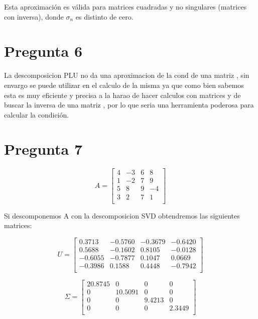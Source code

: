 \documentclass[a4paper,12pt]{article}
\begin{document}
Esta aproximación es válida para matrices cuadradas y no singulares (matrices con inversa), 
donde \( \sigma_n \) es distinto de cero. 

\section*{Pregunta 6}

La descomposicion PLU no da una aproximacion de la cond de una matriz , sin envargo se puede utilizar en el calculo de la misma ya que como bien sabemos esta es muy eficiente y precisa a la harao de hacer calculos con matrices y de buscar la inversa de una matriz , por lo que seria una herramienta poderosa para calcular la condición.

\section*{Pregunta 7}


\[
A = \begin{bmatrix}
4 & -3 & 6 & 8 \\
1 & -2 & 7 & 9 \\
5 & 8 & 9 & -4 \\
3 & 2 & 7 & 1 \\
\end{bmatrix}
\]

Si descomponemos A con la descomposicion SVD obtendremos las siguientes matrices:

\begin{equation*}
U = \begin{bmatrix}
0.3713 & -0.5760 & -0.3679 & -0.6420 \\
0.5688 & -0.1602 & 0.8105 & -0.0128 \\
-0.6055 & -0.7877 & 0.1047 & 0.0669 \\
-0.3986 & 0.1588 & 0.4448 & -0.7942 \\
\end{bmatrix}
\end{equation*}

\begin{equation*}
\Sigma = \begin{bmatrix}
20.8745 & 0 & 0 & 0 \\
0 & 10.5091 & 0 & 0 \\
0 & 0 & 9.4213 & 0 \\
0 & 0 & 0 & 2.3449 \\
\end{bmatrix}
\end{equation*}
\end{document}
